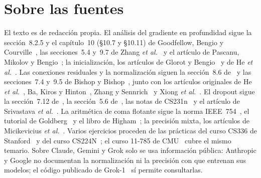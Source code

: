 \documentclass[11pt,a4paper,twoside,openany]{book}
\begin{document}
\section*{Sobre las fuentes}
El texto es de redacción propia. El análisis del gradiente en profundidad sigue la sección~8.2.5 y el capítulo~10 (§10.7 y §10.11) de Goodfellow, Bengio y Courville~\cite{gbc}, las secciones~5.4 y~9.7 de Zhang \emph{et al.}~\cite{d2l} y el artículo de Pascanu, Mikolov y Bengio~\cite{pascanu}; la inicialización, los artículos de Glorot y Bengio~\cite{glorot} y de He \emph{et al.}~\cite{he-init}. Las conexiones residuales y la normalización siguen la sección~8.6 de~\cite{d2l} y las secciones~7.4 y~9.5 de Bishop y Bishop~\cite{bishopdl}, junto con los artículos originales de He \emph{et al.}~\cite{resnet,resnet-id}, Ba, Kiros y Hinton~\cite{layernorm}, Zhang y Sennrich~\cite{rmsnorm} y Xiong \emph{et al.}~\cite{xiong}. El dropout sigue la sección~7.12 de~\cite{gbc}, la sección~5.6 de~\cite{d2l}, las notas de CS231n~\cite{cs231n} y el artículo de Srivastava \emph{et al.}~\cite{srivastava}. La aritmética de coma flotante sigue la norma IEEE~754~\cite{ieee754}, el tutorial de Goldberg~\cite{goldberg} y el libro de Higham~\cite{higham}; la precisión mixta, los artículos de Micikevicius \emph{et al.}~\cite{micikevicius,fp8}. Varios ejercicios proceden de las prácticas del curso CS336 de Stanford~\cite{cs336,cs336b} y del curso CS224N~\cite{cs224n}; el curso 11-785 de CMU~\cite{cmu11785} cubre el mismo temario. Sobre Claude, Gemini y Grok solo se usa información pública: Anthropic y Google no documentan la normalización ni la precisión con que entrenan sus modelos; el código publicado de Grok-1~\cite{grok1} sí permite consultarlas.
\end{document}
